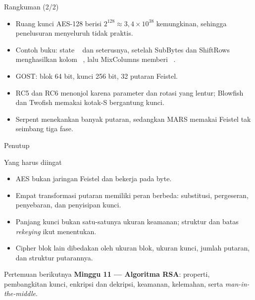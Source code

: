 \documentclass[aspectratio=169,11pt]{beamer}
\begin{document}
\begin{frame}{Rangkuman (2/2)}
    \footnotesize
    \begin{itemize}
        \item Ruang kunci AES-128 berisi $2^{128} \approx 3{,}4 \times
              10^{38}$ kemungkinan, sehingga penelusuran menyeluruh tidak
              praktis.
        \item Contoh buku: state \,\,\,
              dan seterusnya, setelah SubBytes dan ShiftRows menghasilkan
              kolom \,\,\,, lalu
              MixColumns memberi \,\,\,.
        \item GOST: blok 64 bit, kunci 256 bit, 32 putaran Feistel.
        \item RC5 dan RC6 menonjol karena parameter dan rotasi yang
              lentur; Blowfish dan Twofish memakai kotak-S bergantung
              kunci.
        \item Serpent menekankan banyak putaran, sedangkan MARS memakai
              Feistel tak seimbang tiga fase.
    \end{itemize}
\end{frame}

\begin{frame}{Penutup}
    \begin{block}{Yang harus diingat}
        \footnotesize
        \begin{itemize}
            \item AES bukan jaringan Feistel dan bekerja pada byte.
            \item Empat transformasi putaran memiliki peran berbeda:
                  substitusi, pergeseran, penyebaran, dan penyisipan kunci.
            \item Panjang kunci bukan satu-satunya ukuran keamanan;
                  struktur dan batas \textit{rekeying} ikut menentukan.
            \item Cipher blok lain dibedakan oleh ukuran blok, ukuran
                  kunci, jumlah putaran, dan struktur putarannya.
        \end{itemize}
    \end{block}
    \vspace{0.2cm}
    \begin{exampleblock}{Pertemuan berikutnya}
        \textbf{Minggu 11 --- Algoritma RSA}: properti, pembangkitan kunci,
        enkripsi dan dekripsi, keamanan, kelemahan, serta
        \textit{man-in-the-middle}.
    \end{exampleblock}
\end{frame}
\end{document}
